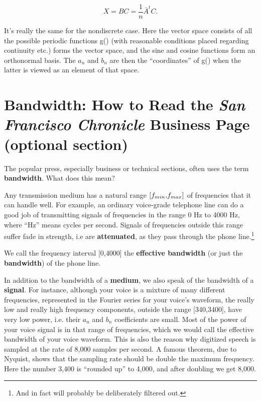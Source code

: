 \begin{equation}
X = B C = \frac{1}{n} \bar{A}^t C.
\end{equation}

It's really the same for the nondiscrete case.  Here the vector space
consists of all the possible periodic functions g() (with reasonable
conditions placed regarding continuity etc.) forms the vector space, and
the sine and cosine functions form an orthonormal basis.  The $a_n$ and
$b_n$ are then the ``coordinates'' of g() when the latter is viewed as
an element of that space.  

\section{Bandwidth: How to Read the \textit{San Francisco Chronicle}
Business Page (optional section)}
\label{sampling}

The popular press, especially business or technical sections, often
uses the term \textbf{bandwidth}. What does this mean?

Any transmission medium has a natural range $[f_{min} \),\( f_{max}]$
of frequencies that it can handle well. For example, an ordinary
voice-grade telephone line can do a good job of transmitting signals of
frequencies in the range 0 Hz to 4000 Hz, where ``Hz'' means cycles
per second. Signals of frequencies outside this range suffer fade in
strength, i.e are \textbf{attenuated}, as they pass through the phone
line.\footnote{And in fact will probably be deliberately filtered out.}

We call the frequency interval [0,4000] the \textbf{effective
bandwidth} (or just the \textbf{bandwidth}) of the phone line.

In addition to the bandwidth of a \textbf{medium}, we also speak of the
bandwidth of a \textbf{signal}. For instance, although your voice is a
mixture of many different frequencies, represented in the Fourier series
for your voice's waveform, the really low and really high frequency
components, outside the range [340,3400], have very low power, i.e.
their $a_{n}$ and $b_{n}$ coefficients are small. Most of the power of
your voice signal is in that range of frequencies, which we would call
the effective bandwidth of your voice waveform.  This is also the reason
why digitized speech is sampled at the rate of 8,000 samples per second.
A famous theorem, due to Nyquist, shows that the sampling rate should be
double the maximum frequency. Here the number 3,400 is ``rounded up'' to
4,000, and after doubling we get 8,000.

